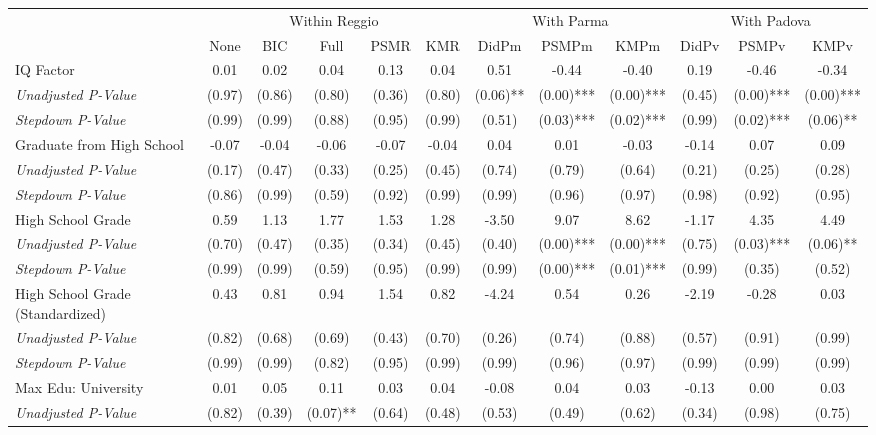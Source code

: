 \begin{tabular}{l c c c c c c c c c c c}
\toprule
& \multicolumn{5}{c}{Within Reggio} & \multicolumn{3}{c}{With Parma} & \multicolumn{3}{c}{With Padova} \\\cmidrule(lr){2-6} \cmidrule(lr){7-9} \cmidrule(lr){10-12}
 & None & BIC & Full & PSMR & KMR & DidPm & PSMPm & KMPm & DidPv & PSMPv & KMPv \\
\midrule
IQ Factor & 0.01 & 0.02 & 0.04 & 0.13 & 0.04 & 0.51 & -0.44 & -0.40 & 0.19 & -0.46 & -0.34 \\
\quad \textit{Unadjusted P-Value} & (0.97) & (0.86) & (0.80) & (0.36) & (0.80) & (0.06)** & (0.00)*** & (0.00)*** & (0.45) & (0.00)*** & (0.00)*** \\
\quad \textit{Stepdown P-Value} & (0.99) & (0.99) & (0.88) & (0.95) & (0.99) & (0.51) & (0.03)*** & (0.02)*** & (0.99) & (0.02)*** & (0.06)** \\
Graduate from High School & -0.07 & -0.04 & -0.06 & -0.07 & -0.04 & 0.04 & 0.01 & -0.03 & -0.14 & 0.07 & 0.09 \\
\quad \textit{Unadjusted P-Value} & (0.17) & (0.47) & (0.33) & (0.25) & (0.45) & (0.74) & (0.79) & (0.64) & (0.21) & (0.25) & (0.28) \\
\quad \textit{Stepdown P-Value} & (0.86) & (0.99) & (0.59) & (0.92) & (0.99) & (0.99) & (0.96) & (0.97) & (0.98) & (0.92) & (0.95) \\
High School Grade & 0.59 & 1.13 & 1.77 & 1.53 & 1.28 & -3.50 & 9.07 & 8.62 & -1.17 & 4.35 & 4.49 \\
\quad \textit{Unadjusted P-Value} & (0.70) & (0.47) & (0.35) & (0.34) & (0.45) & (0.40) & (0.00)*** & (0.00)*** & (0.75) & (0.03)*** & (0.06)** \\
\quad \textit{Stepdown P-Value} & (0.99) & (0.99) & (0.59) & (0.95) & (0.99) & (0.99) & (0.00)*** & (0.01)*** & (0.99) & (0.35) & (0.52) \\
High School Grade (Standardized) & 0.43 & 0.81 & 0.94 & 1.54 & 0.82 & -4.24 & 0.54 & 0.26 & -2.19 & -0.28 & 0.03 \\
\quad \textit{Unadjusted P-Value} & (0.82) & (0.68) & (0.69) & (0.43) & (0.70) & (0.26) & (0.74) & (0.88) & (0.57) & (0.91) & (0.99) \\
\quad \textit{Stepdown P-Value} & (0.99) & (0.99) & (0.82) & (0.95) & (0.99) & (0.99) & (0.96) & (0.97) & (0.99) & (0.99) & (0.99) \\
Max Edu: University & 0.01 & 0.05 & 0.11 & 0.03 & 0.04 & -0.08 & 0.04 & 0.03 & -0.13 & 0.00 & 0.03 \\
\quad \textit{Unadjusted P-Value} & (0.82) & (0.39) & (0.07)** & (0.64) & (0.48) & (0.53) & (0.49) & (0.62) & (0.34) & (0.98) & (0.75) \\

\end{tabular}
